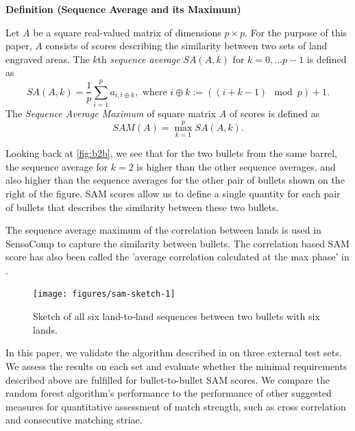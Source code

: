 \documentclass[doubleblind]{elsarticle}\usepackage[]{graphicx}\usepackage[]{color}
\newenvironment{knitrout}{}{} %
\newenvironment{definition}[1]%
{%
  \par\vspace{.75\baselineskip}\noindent 
  \textbf{Definition (#1)}\begin{itshape}%
  \par\vspace{.5\baselineskip}\noindent\ignorespaces 
}%
{%
  \end{itshape}\ignorespacesafterend 
}
\begin{document}
\begin{definition}{Sequence Average and its Maximum}
Let $A$ be a square real-valued matrix of dimensions $p \times p$. For the purpose of this paper, $A$ consists of scores describing the similarity between two sets of land engraved areas.
The $k$th \emph{sequence average} $SA(A, k)$ for $k = 0, ... p-1$ is defined  as 
$$SA(A, k) = \frac{1}{p} \sum_{i=1}^{p} a_{i,i \oplus k}, \text{ where } i\oplus k := \left((i + k - 1)\mod p\right) + 1.$$
The \emph{Sequence Average Maximum} \citep[SAM, ][]{sam} of square matrix $A$ of scores is defined as
$$SAM (A) = \max_{k = 1}^{p} SA(A, k).$$
\end{definition}
Looking back at \autoref{fig:b2b}, we see that for the two bullets from the same barrel, the sequence average for 
$k=2$ is higher than the other sequence averages, and also higher than the sequence averages for the other pair of bullets shown on the right of the figure. SAM scores allow us to define a single quantity for each pair of bullets that describes the similarity between these two bullets. 

The sequence average maximum of the correlation between lands is used in SensoComp \citep{sensofar-sam} to capture the similarity between bullets. The correlation based SAM score has also been called the 'average correlation calculated at the max phase' in \citet{chuPilotStudyAutomated2010}. 

\begin{knitrout}
\color{fgcolor}\begin{figure}

{\centering \texttt{[image: figures/sam-sketch-1]} 

}

\caption[Sketch of all six land-to-land sequences between two bullets with six lands]{Sketch of all six land-to-land sequences between two bullets with six lands.}\label{fig:sam-sketch}
\end{figure}


\end{knitrout}


In this paper, we validate the algorithm described in \citet{aoas2} on three external test sets. We assess the results on each set and evaluate whether the minimal requirements described above are fulfilled for bullet-to-bullet SAM scores. We compare the random forest algorithm's performance to the performance of other suggested measures for quantitative assessment of match strength, such as cross correlation and consecutive matching striae. 
\end{document}
